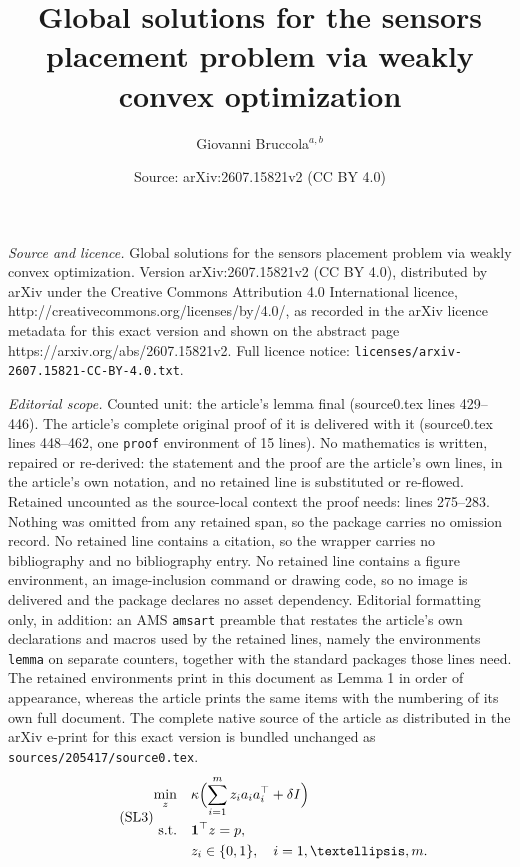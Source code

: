 \documentclass[10pt,a4paper]{amsart}
\title{Global solutions for the sensors placement problem via weakly convex optimization}
\author{Giovanni Bruccola${}^{a,b}$}
\date{Source: arXiv:2607.15821v2 (CC BY 4.0)}
\begin{document}
\maketitle

\noindent\emph{Source and licence.} Global solutions for the sensors placement problem via weakly convex optimization. Version arXiv:2607.15821v2 (CC BY 4.0), distributed by arXiv under the Creative Commons Attribution 4.0 International licence, http://creativecommons.org/licenses/by/4.0/, as recorded in the arXiv licence metadata for this exact version and shown on the abstract page https://arxiv.org/abs/2607.15821v2. Full licence notice: \texttt{licenses/arxiv-2607.15821-CC-BY-4.0.txt}.\par\smallskip

\noindent\textit{Editorial scope.} Counted unit: the article's lemma final (source0.tex lines 429--446). The article's complete original proof of it is delivered with it (source0.tex lines 448--462, one \texttt{proof} environment of 15 lines). No mathematics is written, repaired or re-derived: the statement and the proof are the article's own lines, in the article's own notation, and no retained line is substituted or re-flowed.  Retained uncounted as the source-local context the proof needs: lines 275--283.  Nothing was omitted from any retained span, so the package carries no omission record.  No retained line contains a citation, so the wrapper carries no bibliography and no bibliography entry.  No retained line contains a figure environment, an image-inclusion command or drawing code, so no image is delivered and the package declares no asset dependency.  Editorial formatting only, in addition: an AMS \texttt{amsart} preamble that restates the article's own declarations and macros used by the retained lines, namely the environments \texttt{lemma} on separate counters, together with the standard packages those lines need.  The retained environments print in this document as Lemma 1 in order of appearance, whereas the article prints the same items with the numbering of its own full document.  The complete native source of the article as distributed in the arXiv e-print for this exact version is bundled unchanged as \texttt{sources/205417/source0.tex}.
\begin{equation}
\tag{SL3}
\label{prob: sensor placement 3}
\begin{aligned}
\min_z \quad & \kappa\Bigl( \sum_{i=1}^m z_i a_i a_i^\top + \delta I \Bigr) \\
\text{s.t.} \quad & \mathbf{1}^\top z = p, \\
& z_i \in \{0,1\}, \quad i = 1, \dots, m.
\end{aligned}
\end{equation}
\end{document}
